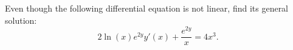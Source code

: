 \begin{exercises}
\begin{problist}
	\prob Even though the following differential equation is not linear, find its general solution:
		$$ 2 \ln(x) e^{2y} y'(x) + \frac{e^{2y}}{x} = 4x^3.$$

	
	\end{problist}
\end{exercises}
